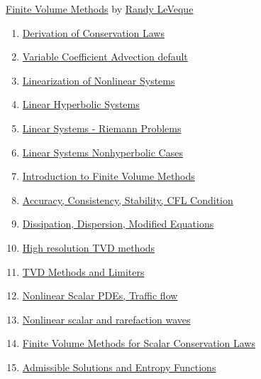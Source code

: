 \documentclass[11pt]{article}
\begin{document}
\begin{center}
	{\large   \href{https://faculty.washington.edu/rjl/classes/am574w2023/}{Finite Volume Methods}} by {\large \href{https://amath.washington.edu/people/randy-leveque}{Randy LeVeque}}
\end{center}

\vspace{-0.75cm}

\begin{enumerate}
	\item \href{https://mp.weixin.qq.com/s/4GLJvMPV8FCq_jUI0WE4bw}{Derivation of Conservation Laws}	%
	\item \href{https://mp.weixin.qq.com/s/XEijXbgnhP0FBhnhE1KJIQ}{Variable Coefficient Advection default}	%
	\item \href{https://mp.weixin.qq.com/s/sm4sgWfx0kGUD05r1Ot1MA}{Linearization of Nonlinear Systems}	%
	\item \href{https://mp.weixin.qq.com/s/lNjwuU41J_DagQSlHohVcw}{Linear Hyperbolic Systems}	%
	\item \href{https://mp.weixin.qq.com/s/bthCrLbGabbSXZLWYsInLQ}{Linear Systems - Riemann Problems}	%
	\item \href{https://mp.weixin.qq.com/s/x_nEO6Kq_A1ymAQAgCr2AQ}{Linear Systems Nonhyperbolic Cases}	%
	\item \href{https://mp.weixin.qq.com/s/0j1fEMZu-9a8ATWkpvYI1A}{Introduction to Finite Volume Methods}	%
	\item \href{https://mp.weixin.qq.com/s/T4EC8Ad4mi5sLZkEpz-IhA}{Accuracy, Consistency, Stability, CFL Condition}	%
	\item \href{https://mp.weixin.qq.com/s/bnZTFxqizNQyrG6xFTouvw}{Dissipation, Dispersion, Modified Equations}	%
	\item \href{https://mp.weixin.qq.com/s/CyZzcLhrfiLadluHfomccQ}{High resolution TVD methods}	%
	\item \href{https://mp.weixin.qq.com/s/V13b46YKR6T3sA-TSZ4wUw}{TVD Methods and Limiters}	%
	\item \href{https://mp.weixin.qq.com/s/vtnG4_av60ZuSM_EKMzvcg}{Nonlinear Scalar PDEs, Traffic flow}	%
	\item \href{https://mp.weixin.qq.com/s/WfZd_-7G9UF7-BY1w9Vi1Q}{Nonlinear scalar and rarefaction waves}	%
	\item \href{https://mp.weixin.qq.com/s/BpLLVds39fX4wIb8EExwgg}{Finite Volume Methods for Scalar Conservation Laws}	%
	\item \href{https://mp.weixin.qq.com/s/MMyTTCNwX3j5VaY1weNJ9Q}{Admissible Solutions and Entropy Functions}	%

\end{enumerate}
\end{document}
